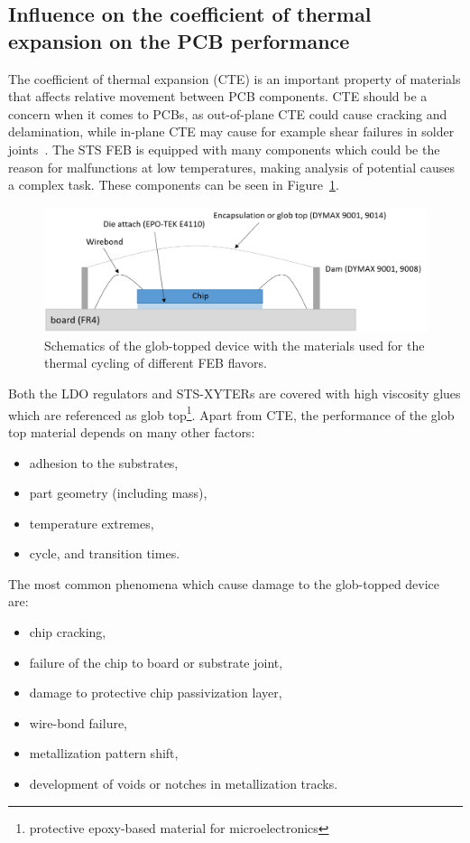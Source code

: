 \subsection{Influence on the coefficient of thermal expansion on the PCB performance}

The coefficient of thermal expansion (\gls{CTE}) is an important property of materials that affects relative movement between \gls{PCB} components. \gls{CTE} should be a concern when it comes to \glspl{PCB}, as out-of-plane \gls{CTE} could cause cracking and delamination, while in-plane \gls{CTE} may cause for example shear failures in solder joints~\cite{cte_report}. The \gls{STS} \gls{FEB} is equipped with many components which could be the reason for malfunctions at low temperatures, making analysis of potential causes a complex task. 
These components can be seen in Figure~\ref{fig_globtop}.
\begin{figure}[!h]
\centering
\includegraphics[width=0.85\columnwidth]{Chapter4/images/glob_topped_device.png}
\caption{Schematics of the glob-topped device with the materials used for the thermal cycling of different FEB flavors.}
\label{fig_globtop}
\end{figure}

Both the LDO regulators and STS-XYTERs are covered with high viscosity glues which are referenced as glob top\footnote{protective epoxy-based material for microelectronics}. Apart from \gls{CTE}, the performance of the glob top material depends on many other factors:
\begin{itemize}
    \item adhesion to the substrates,
    \item part geometry (including mass),
    \item temperature extremes,
    \item cycle, and transition times.
\end{itemize}


The most common phenomena which cause damage to the glob-topped device are:
\begin{itemize}
    \item chip cracking,
    \item failure of the chip to board or substrate joint,
    \item damage to protective chip passivization layer,
    \item wire-bond failure,
    \item metallization pattern shift,
    \item development of voids or notches in metallization tracks. 
\end{itemize}


